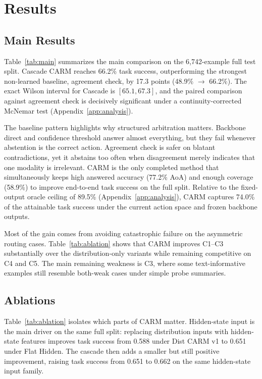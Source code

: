 \documentclass[11pt]{article}
\begin{document}
\section{Results}
\label{sec:results}

\subsection{Main Results}

Table~\ref{tab:main} summarizes the main comparison on the 6,742-example full test split.
Cascade CARM reaches 66.2\% task success, outperforming the strongest non-learned
baseline, agreement check, by 17.3 points (48.9\% $\rightarrow$ 66.2\%). The exact Wilson
interval for Cascade is $[65.1, 67.3]$, and the paired comparison against agreement check
is decisively significant under a continuity-corrected McNemar test
(Appendix~\ref{app:analysis}).

The baseline pattern highlights why structured arbitration matters. Backbone direct and
confidence threshold answer almost everything, but they fail whenever abstention is the
correct action. Agreement check is safer on blatant contradictions, yet it abstains too
often when disagreement merely indicates that one modality is irrelevant. CARM is the only
completed method that simultaneously keeps high answered accuracy (77.2\% AoA) and enough
coverage (58.9\%) to improve end-to-end task success on the full split. Relative to the
fixed-output oracle ceiling of 89.5\% (Appendix~\ref{app:analysis}), CARM captures 74.0\%
of the attainable task success under the current action space and frozen backbone outputs.

Most of the gain comes from avoiding catastrophic failure on the asymmetric routing cases.
Table~\ref{tab:ablation} shows that CARM improves C1--C3 substantially over the
distribution-only variants while remaining competitive on C4 and C5. The main remaining
weakness is C3, where some text-informative examples still resemble both-weak cases under
simple probe summaries.



\subsection{Ablations}

Table~\ref{tab:ablation} isolates which parts of CARM matter. Hidden-state input is the
main driver on the same full split: replacing distribution inputs with hidden-state features
improves task success from 0.588 under Dist CARM v1 to 0.651 under Flat Hidden. The cascade
then adds a smaller but still positive improvement, raising task success from 0.651 to
0.662 on the same hidden-state input family.
\end{document}

